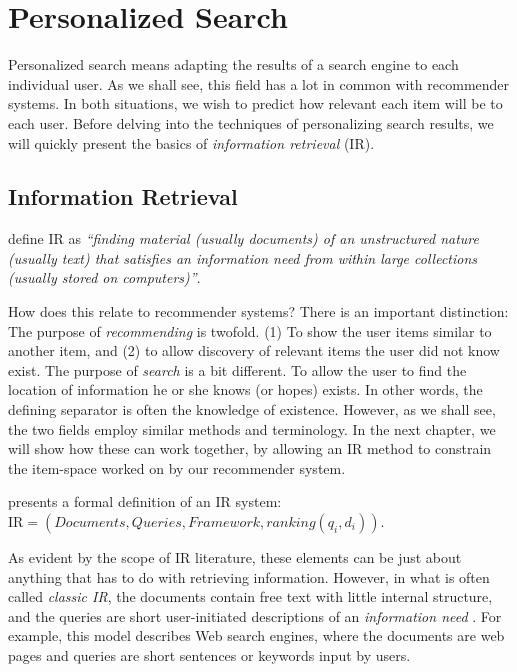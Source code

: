 \section{Personalized Search}
\label{sec:search}

Personalized search means adapting the results of a search engine to each individual user.
As we shall see, this field has a lot in common with recommender systems.
In both situations, we wish to predict how relevant each item will be to each user.
Before delving into the techniques of personalizing search results, we will quickly present 
the basics of \emph{information retrieval} (IR).

\subsection{Information Retrieval}
\label{sec:ir}

\citet[p1]{Manning2008} define IR as \emph{``finding material (usually documents) of
an unstructured nature (usually text) that satisfies an information need
from within large collections (usually stored on computers)''}.

How does this relate to recommender systems? There is an important distinction:
The purpose of \emph{recommending} is twofold. (1) To show the user items
similar to another item, and (2) to allow discovery of relevant items the user did not know exist.
The purpose of \emph{search} is a bit different. To allow the user to find the location of
information he or she knows (or hopes) exists.
In other words, the defining separator is often the knowledge of existence.
However, as we shall see, the two fields employ similar methods and terminology. 
In the next chapter, we will show how these can work together,
by allowing an IR method to constrain the item-space worked on by our recommender system.

\citet[p23]{Baeza-Yates1999} presents a formal definition of an IR system:
$\mathrm{IR} = (Documents, Queries, Framework, ranking(q_i, d_i))$.

As evident by the scope of IR literature, these elements can be just about anything
that has to do with retrieving information. However, in what is often called
\emph{classic IR}, the documents contain free text with little internal structure,
and the queries are short user-initiated descriptions of an \emph{information need} \citep[p19]{Baeza-Yates1999}. 
For example, this model describes Web search engines, where the documents are web pages and
queries are short sentences or keywords input by users.

